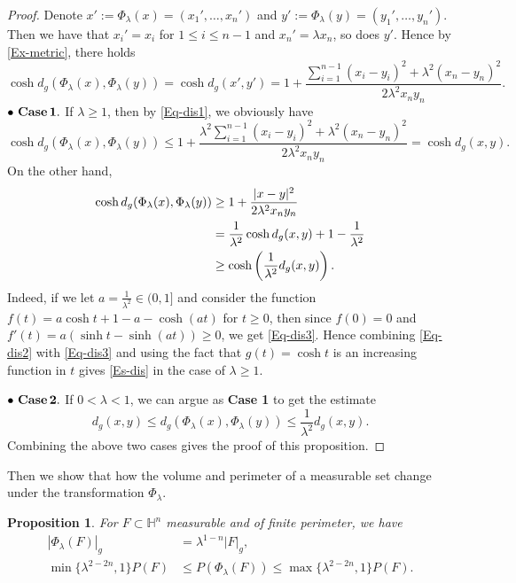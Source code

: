 \documentclass[11pt,reqno]{amsart}
\newtheorem{prop}[thm]{Proposition}
\theoremstyle{definition}
\theoremstyle{remark}
\numberwithin{equation}{section}
\renewcommand{\(}{\left(}
\renewcommand{\)}{\right)}
\renewcommand{\-}{\overline}
\begin{document}
\begin{proof}
	Denote $x':=\Phi_{\lambda}(x)=(x_1',\dots,x_n')$ and $y':=\Phi_{\lambda}(y)=(y_1',\dots,y_n')$. Then we have that $x_i'=x_i$ for $1\leq i\leq n-1$ and $x_n'=\lambda x_n$, so does $y'$. Hence by \eqref{Ex-metric}, there holds
	\begin{equation}\label{Eq-dis1}
		\cosh d_{g}(\Phi_{\lambda}(x),\Phi_{\lambda}(y))=\cosh d_{g}(x',y')=1+\frac{\sum_{i=1}^{n-1}(x_i-y_i)^2+{\lambda}^2(x_n-y_n)^2}{2{\lambda}^2 x_n y_n}.
			\end{equation}
$\bullet\,\,\bf{Case\,1.}$ If $\lambda\geq 1$, then by \eqref{Eq-dis1}, we obviously have
	\begin{equation}\label{Eq-dis2}
		\cosh d_{g}(\Phi_{\lambda}(x),\Phi_{\lambda}(y))\leq 1+\frac{{\lambda}^2\sum_{i=1}^{n-1}(x_i-y_i)^2+{\lambda}^2(x_n-y_n)^2}{2{\lambda}^2 x_n y_n}=\cosh d_g(x,y).
	\end{equation}
On the other hand, 
\begin{align}
	\cosh d_{g}(\Phi_{\lambda}(x),\Phi_{\lambda}(y))&\geq 1+\frac{|x-y|^2}{2{\lambda}^2 x_n y_n}\notag\\
	&=\frac{1}{{\lambda}^2}\cosh d_g(x,y)+1-\frac{1}{{\lambda}^2}\notag\\
	&\geq \cosh\left(\frac{1}{{\lambda}^2}d_g(x,y)\right).\label{Eq-dis3}
\end{align}
Indeed, if we let $a=\frac{1}{{\lambda}^2}\in(0,1]$ and consider the function $f(t)=a\cosh t+1-a-\cosh(at)$ for $t\geq 0$, then since $f(0)=0$ and $f'(t)=a(\sinh t-\sinh(at))\geq 0$, we get \eqref{Eq-dis3}. Hence combining \eqref{Eq-dis2} with \eqref{Eq-dis3} and using the fact that $g(t)=\cosh t$ is an increasing function in $t$ gives \eqref{Es-dis} in the case of $\lambda\geq 1$. 

\noindent$\bullet\,\,\bf{Case\,2.}$ If $0<\lambda<1$, we can argue as {\bf{Case 1}} to get the estimate
\begin{equation*}
		d_g(x,y)\leq d_g(\Phi_{\lambda}(x),\Phi_{\lambda}(y))\leq\frac{1}{{\lambda}^2}d_g(x,y).
\end{equation*}
Combining the above two cases gives the proof of this proposition. 
\end{proof}
Then we show that how the volume and perimeter of a measurable set change under the transformation $\Phi_{\lambda}$.
\begin{prop}\label{Prop-VP}
	For $F\subset\mathbb{H}^n$ measurable and of finite perimeter, we have
	\begin{align}
		|\Phi_{\lambda}(F)|_g&={\lambda}^{1-n}|F|_g,\label{Re-volume}\\
		\min\{{\lambda}^{2-2n},1\}P(F)&\leq P(\Phi_{\lambda}(F))\leq \max\{{\lambda}^{2-2n},1\}P(F).\label{Re-perimeter}
	\end{align}
\end{prop}
\end{document}
